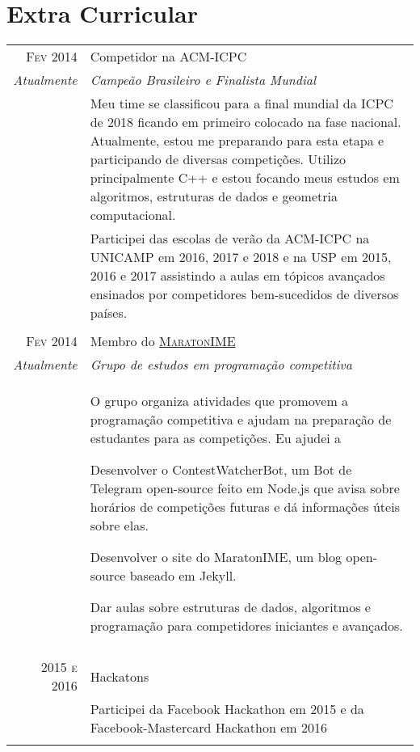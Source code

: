 \documentclass[a4paper,10pt]{article} %
\begin{document}
\section{Extra Curricular}
\begin{tabular}{r|p{11cm}}
\textsc{Fev 2014}     & Competidor na \textsc{ACM-ICPC} \\
\emph{Atualmente}        & \hfill \hfill \textit{Campeão Brasileiro e Finalista Mundial} \\
    & \footnotesize{Meu time se classificou para a final mundial da ICPC de 2018 ficando em primeiro colocado na fase nacional. Atualmente, estou me preparando para esta etapa e participando de diversas competições. Utilizo principalmente C++ e estou focando meus estudos em algoritmos, estruturas de dados e geometria computacional.}\\
    & \footnotesize{Participei das escolas de verão da \textsc{ACM-ICPC} na UNICAMP em 2016, 2017 e 2018 e na USP em 2015, 2016 e 2017 assistindo a aulas em tópicos avançados ensinados por competidores bem-sucedidos de diversos países.} \\
\multicolumn{2}{c}{} \\

\textsc{Fev 2014}     & Membro do \textsc{\href{https://www.ime.usp.br/~maratona/}{MaratonIME}} \\
\emph{Atualmente}        & \hfill \hfill \textit{Grupo de estudos em programação competitiva} \\
    &\footnotesize{O grupo organiza atividades que promovem a programação competitiva e ajudam na preparação de estudantes para as competições. Eu ajudei a} \begin{itemize} \footnotesize{
        \item Desenvolver o ContestWatcherBot, um Bot de Telegram open-source feito em Node.js que avisa sobre horários de competições futuras e dá informações úteis sobre elas.
        \item Desenvolver o site do MaratonIME, um blog open-source baseado em Jekyll.
        \item Dar aulas sobre estruturas de dados, algoritmos e programação para competidores iniciantes e avançados.
    } \end{itemize} \\
\multicolumn{2}{c}{} \\

\textsc{2015 e 2016} & Hackatons \\
& \footnotesize{Participei da Facebook Hackathon em 2015 e da Facebook-Mastercard Hackathon em 2016} \\
\multicolumn{2}{c}{} \\


\end{tabular}
\end{document}
